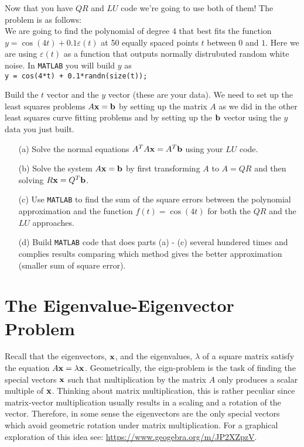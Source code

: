 \begin{problem}
    Now that you have $QR$ and $LU$ code we're going to use both of them!  The problem is
    as follows: \\
    We are going to find the polynomial of degree 4 that best fits the function $y =
    \cos(4t) + 0.1 \varepsilon(t)$ at 50 equally spaced points $t$ between $0$ and $1$.  Here
    we are using $\varepsilon(t)$ as a function that outputs normally distrubuted random
    white noise.  In \texttt{MATLAB} you will build $y$ as \\
    \texttt{y = cos(4*t) + 0.1*randn(size(t));}
    
    Build the $t$ vector
    and the $y$ vector (these are your data).  We need to set up the least squares
    problems $A {\bf x} = {\bf b}$ by setting up the matrix $A$
    as we did in the other least squares curve fitting problems and by setting up the
    ${\bf b}$ vector using the $y$ data you just built.  
    \begin{enumerate}
        \item[(a)] Solve the normal equations $A^T A {\bf x} = A^T {\bf b}$ using your $LU$ code.
        \item[(b)] Solve the system $A {\bf x} = {\bf b}$ by first transforming $A$ to $A = QR$
            and then solving $R{\bf x} = Q^T {\bf b}$.
        \item[(c)] Use \texttt{MATLAB} to find the sum of the square errors between the
            polynomial approximation and the function $f(t) = \cos(4t)$ for both the $QR$
            and the $LU$ approaches.  
        \item[(d)] Build \texttt{MATLAB} code that does parts (a) - (c) several hundered
            times and complies results comparing which method gives the better
            approximation (smaller sum of square error).
    \end{enumerate}
\end{problem}


\section{The Eigenvalue-Eigenvector Problem}
Recall that the eigenvectors, ${\bf x}$, and the eigenvalues, $\lambda$ of a square matrix satisfy the
equation $A{\bf x}=\lambda {\bf x}$. Geometrically, the eign-problem is the task of finding the special
vectors ${\bf x}$ such that multiplication by the matrix $A$ only produces a scalar multiple of
${\bf x}$. Thinking about matrix multiplication, this is rather peculiar since matrix-vector
multiplication usually results in a scaling and a rotation of the vector. Therefore, in
some sense the eigenvectors are the only special vectors which avoid geometric rotation
under matrix multiplication.  For a graphical exploration of this idea see:
\href{https://www.geogebra.org/m/JP2XZpzV}{https://www.geogebra.org/m/JP2XZpzV}.

